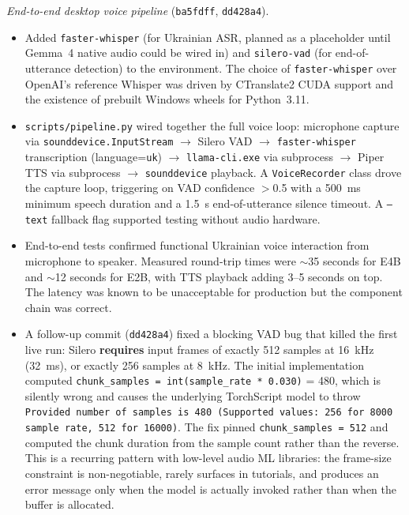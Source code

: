 \documentclass{article}
\theoremstyle{plain}
\theoremstyle{definition}
\theoremstyle{remark}
\begin{document}
\textit{End-to-end desktop voice pipeline} (\texttt{ba5fdff}, \texttt{dd428a4}).
\begin{itemize}
\item Added \texttt{faster-whisper} (for Ukrainian ASR, planned as a placeholder until Gemma~4 native audio could be wired in) and \texttt{silero-vad} (for end-of-utterance detection) to the environment. The choice of \texttt{faster-whisper} over OpenAI's reference Whisper was driven by CTranslate2 CUDA support and the existence of prebuilt Windows wheels for Python~3.11.
\item \texttt{scripts/pipeline.py} wired together the full voice loop: microphone capture via \texttt{sounddevice.InputStream} $\rightarrow$ Silero VAD $\rightarrow$ \texttt{faster-whisper} transcription (language=\texttt{uk}) $\rightarrow$ \texttt{llama-cli.exe} via subprocess $\rightarrow$ Piper TTS via subprocess $\rightarrow$ \texttt{sounddevice} playback. A \texttt{VoiceRecorder} class drove the capture loop, triggering on VAD confidence $>$0.5 with a 500~ms minimum speech duration and a 1.5~s end-of-utterance silence timeout. A \texttt{--text} fallback flag supported testing without audio hardware.
\item End-to-end tests confirmed functional Ukrainian voice interaction from microphone to speaker. Measured round-trip times were $\sim$35 seconds for E4B and $\sim$12 seconds for E2B, with TTS playback adding 3--5 seconds on top. The latency was known to be unacceptable for production but the component chain was correct.
\item A follow-up commit (\texttt{dd428a4}) fixed a blocking VAD bug that killed the first live run: Silero \textbf{requires} input frames of exactly 512 samples at 16~kHz (32~ms), or exactly 256 samples at 8~kHz. The initial implementation computed \texttt{chunk\_samples = int(sample\_rate * 0.030)} = 480, which is silently wrong and causes the underlying TorchScript model to throw \texttt{Provided number of samples is 480 (Supported values: 256 for 8000 sample rate, 512 for 16000)}. The fix pinned \texttt{chunk\_samples = 512} and computed the chunk duration from the sample count rather than the reverse. This is a recurring pattern with low-level audio ML libraries: the frame-size constraint is non-negotiable, rarely surfaces in tutorials, and produces an error message only when the model is actually invoked rather than when the buffer is allocated.
\end{itemize}
\end{document}
